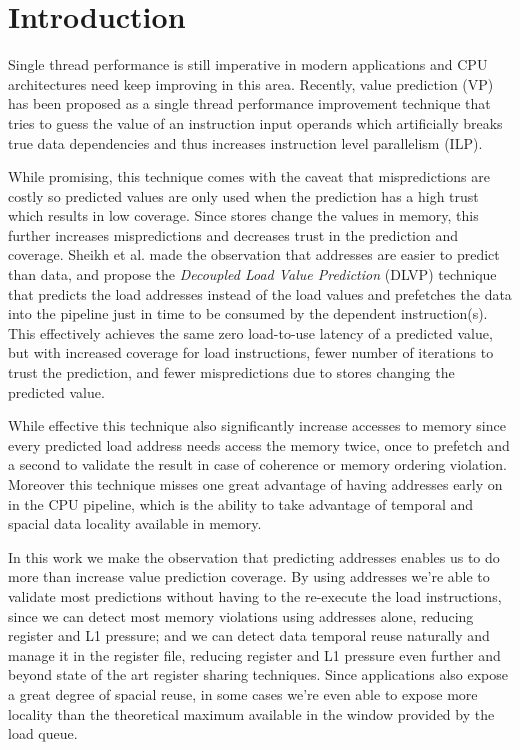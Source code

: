\documentclass{sig-alternate}
\begin{document}
\section{Introduction}
Single thread performance is still imperative in modern applications and CPU architectures need keep improving in this area. Recently, value prediction (VP) has been proposed as a single thread performance improvement technique that tries to guess the value of an instruction input operands which artificially breaks true data dependencies and thus increases instruction level parallelism (ILP).

While promising, this technique comes with the caveat that mispredictions are costly so predicted values are only used when the prediction has a high trust which results in low coverage. Since stores change the values in memory, this further increases mispredictions and decreases trust in the prediction and coverage. Sheikh et al. made the observation that addresses are easier to predict than data, and propose the \textit{Decoupled Load Value Prediction} (DLVP) technique that predicts the load addresses instead of the load values and prefetches the data into the pipeline just in time to be consumed by the dependent instruction(s). This effectively achieves the same zero load-to-use latency of a predicted value, but with increased coverage for load instructions, fewer number of iterations to trust the prediction, and fewer mispredictions due to stores changing the predicted value.

While effective this technique also significantly increase accesses to memory since every predicted load address needs access the memory twice, once to prefetch and a second to validate the result in case of coherence or memory ordering violation. Moreover this technique misses one great advantage of having addresses early on in the CPU pipeline, which is the ability to take advantage of temporal and spacial data locality available in memory.

In this work we make the observation that predicting addresses enables us to do more than increase value prediction coverage. By using addresses we're able to validate most predictions without having to the re-execute the load instructions, since we can detect most memory violations using addresses alone, reducing register and L1 pressure; and we can detect data temporal reuse naturally and manage it in the register file, reducing register and L1 pressure even further and beyond state of the art register sharing techniques. Since applications also expose a great degree of spacial reuse, in some cases we're even able to expose more locality than the theoretical maximum available in the window provided by the load queue. 
\end{document}

